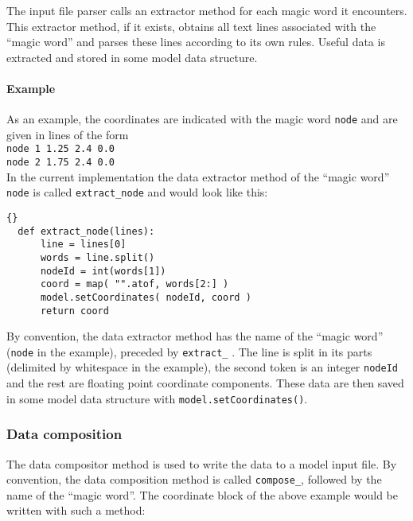 The input file parser calls an extractor method for each magic word it
encounters. This extractor method, if it exists, obtains all text lines
associated with the ``magic word'' and parses these lines according to its own
rules. Useful data is extracted and stored in some model data structure.


\paragraph{Example}
\label{sec:example-data-extraction}

As an example, the coordinates are indicated with the magic word
\texttt{node} and are given in lines of the form\\

\texttt{node 1 1.25 2.4  0.0 }\\
\texttt{node 2 1.75 2.4  0.0 }\\

In the current implementation the data extractor method of the ``magic word''
\texttt{node} is called \texttt{extract\_node} and would look like this:\\

\lstset{language=Python,basicstyle=\small}
\begin{lstlisting}{}
  def extract_node(lines):
      line = lines[0]
      words = line.split()
      nodeId = int(words[1])
      coord = map( "".atof, words[2:] )
      model.setCoordinates( nodeId, coord )
      return coord
\end{lstlisting}

By convention, the data extractor method has the name of the ``magic word''
(\texttt{node} in the example), preceded by \texttt{extract\_} . The line is
split in its parts (delimited by whitespace in the example), the second token
is an integer \texttt{nodeId} and the rest are floating point coordinate
components. These data are then saved in some model data structure with
\texttt{model.setCoordinates()}.


\subsubsection{Data composition}
\label{sec:data-composition}

The data compositor method is used to write the data to a model input file.
By convention, the data composition method is called \texttt{compose\_},
followed by the name of the ``magic word''. The coordinate block of the above
example would be written with such a method:

